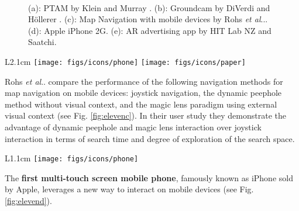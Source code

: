 \documentclass[12pt,a4paper]{article}
\makeatletter
\DeclareRobustCommand\onedot{\futurelet\@let@token\@onedot}
\def\@onedot{\ifx\@let@token.\else.\null\fi\xspace}
\def\etal{\emph{et al}\onedot}
\makeatother
\begin{document}
\begin{figure}[tbp]
\centering
\vspace{-70pt}
 \hfill
{} \hfill 
{} \\ \hfill
{} \hfill
{} \hfill
\vspace{-10pt}
\caption{(a): PTAM by Klein and Murray \cite{Klein07}. (b): Groundcam by DiVerdi and H\"ollerer \cite{DiVerdi07}. (c): Map Navigation with mobile devices by Rohs \etal \cite{Rohs07}. (d): Apple iPhone 2G. (e): AR advertising app by HIT Lab NZ and Saatchi.} \label{fig:eleven}
\end{figure}
 
\vspace{0.1in}

\begin{wrapfigure}{L}{2.1cm}
	\vspace{-15pt}	
	\texttt{[image: figs/icons/phone]}
	\texttt{[image: figs/icons/paper]}	
	\vspace{-25pt}		
\end{wrapfigure}
\noindent Rohs \etal compare the performance of the following navigation methods for map navigation on mobile devices: joystick navigation, the dynamic peephole method without visual context, and the magic lens paradigm using external visual context \cite{Rohs07} (see Fig. \ref{fig:elevenc}). In their user study they demonstrate the advantage of dynamic peephole and magic lens interaction over joystick interaction in terms of search time and degree of exploration of the search space.

\vspace{0.1in}

\begin{wrapfigure}{L}{1.1cm}
	\vspace{-0pt}	
	\texttt{[image: figs/icons/phone]}
	\vspace{-20pt}		
\end{wrapfigure}
\noindent The \textbf{first multi-touch screen mobile phone}, famously known as iPhone sold by Apple, leverages a new way to interact on mobile devices (see Fig. \ref{fig:elevend}).
\end{document}
